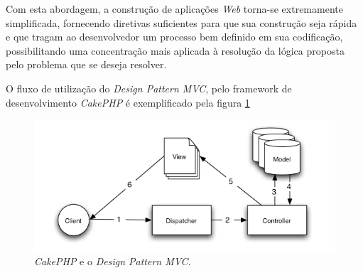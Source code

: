 Com esta abordagem, a construção de aplicações \textit{Web} torna-se extremamente simplificada, fornecendo diretivas suficientes para que sua construção seja rápida e que tragam ao desenvolvedor um processo bem definido em sua codificação, possibilitando uma concentração mais aplicada à resolução da lógica proposta pelo problema que se deseja resolver.

O fluxo de utilização do \textit{Design Pattern MVC}, pelo framework de desenvolvimento \nohyphens{\textit{CakePHP}} é exemplificado pela figura \ref{figura:MVC_CakePHP}

\begin{figure}[h!tp]
    \begin{center}
        \includegraphics[scale=0.8]{./figuras/basic_mvc_cake.png}

        \caption{\label{figura:MVC_CakePHP}\textit{CakePHP} e o \textit{Design Pattern MVC}.}
    \end{center}
\end{figure}

